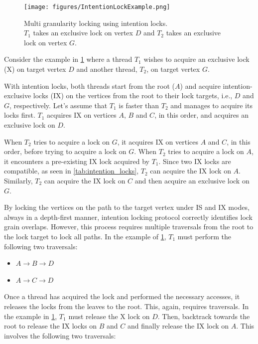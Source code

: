 \begin{figure}[h]
    \centering
    \captionsetup{justification=centering}
    \texttt{[image: figures/IntentionLockExample.png]}
    \caption{Multi granularity locking using intention locks. \\ $T_1$ takes an exclusive lock on vertex $D$ and $T_2$ takes an exclusive lock on vertex $G$. }
    \label{fig:intention_lock_example}
\end{figure}

Consider the example in \cref{fig:intention_lock_example} where a thread $T_1$ wishes to acquire an exclusive lock (X) on target vertex $D$ and another thread, $T_2$, on target vertex $G$. 

With intention locks, both threads start from the root ($A$) and acquire intention-exclusive locks (IX) on the vertices from the root to their lock targets, i.e., $D$ and $G$, respectively. 
Let's assume that $T_1$ is faster than $T_2$ and manages to acquire its locks first. 
$T_1$ acquires IX on vertices $A$, $B$ and $C$, in this order, and acquires an exclusive lock on $D$. 

When $T_2$ tries to acquire a lock on $G$, it acquires IX on vertices $A$ and $C$, in this order, before trying to acquire a lock on $G$. 
When $T_2$ tries to acquire a lock on $A$, it encounters a pre-existing  IX lock acquired by $T_1$. 
Since two IX locks are compatible, as seen in \cref{tab:intention_locks}, $T_2$ can acquire the IX lock on $A$.
Similarly, $T_2$ can acquire the IX lock on $C$ and then acquire an exclusive lock on $G$.


By locking the vertices on the path to the target vertex under IS and IX modes, always in a depth-first manner, 
intention locking protocol correctly identifies lock grain overlaps. 
However, this process requires multiple traversals from the root to the lock target to lock all paths. 
In the example of \cref{fig:intention_lock_example}, $T_1$ must perform the following two traversals:

\begin{itemize}
    \item $A \rightarrow B \rightarrow D$
    \item $A \rightarrow C \rightarrow D$
\end{itemize}

Once a thread has acquired the lock and performed the necessary accesses, it releases the locks from the leaves to the root. This, again, requires traversals. In the example in \cref{fig:intention_lock_example}, $T_1$ must release the X lock on $D$. Then, backtrack towards the root to release the IX locks on $B$ and $C$ and finally release the IX lock on $A$. This involves the following two traversals:

